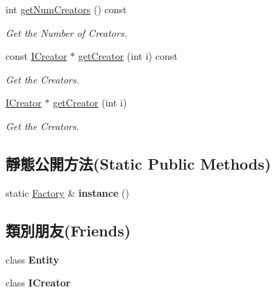 \begin{DoxyCompactItemize}
int \hyperlink{class_i_dream_sky_1_1_entity_1_1_factory_aa0df0ff18a2253daaf5a9542e7c211d9}{get\+Num\+Creators} () const 
\begin{DoxyCompactList}\small\item\em Get the Number of Creators. \end{DoxyCompactList}\item 
const \hyperlink{class_i_dream_sky_1_1_entity_1_1_i_creator}{I\+Creator} $\ast$ \hyperlink{class_i_dream_sky_1_1_entity_1_1_factory_a77214e9240de96dc15ac4b17cff90905}{get\+Creator} (int i) const 
\begin{DoxyCompactList}\small\item\em Get the Creators. \end{DoxyCompactList}\item 
\hyperlink{class_i_dream_sky_1_1_entity_1_1_i_creator}{I\+Creator} $\ast$ \hyperlink{class_i_dream_sky_1_1_entity_1_1_factory_aba98c9dfb45cb78f8c5430d27682c7fd}{get\+Creator} (int i)
\begin{DoxyCompactList}\small\item\em Get the Creators. \end{DoxyCompactList}\end{DoxyCompactItemize}
\subsection*{靜態公開方法(Static Public Methods)}
\begin{DoxyCompactItemize}
\item 
static \hyperlink{class_i_dream_sky_1_1_entity_1_1_factory}{Factory} \& {\bfseries instance} ()\hypertarget{class_i_dream_sky_1_1_entity_1_1_factory_ae0bfdc4b2ce5f66204595dcac9ce1c36}{}\label{class_i_dream_sky_1_1_entity_1_1_factory_ae0bfdc4b2ce5f66204595dcac9ce1c36}

\end{DoxyCompactItemize}
\subsection*{類別朋友(Friends)}
\begin{DoxyCompactItemize}
\item 
class {\bfseries Entity}\hypertarget{class_i_dream_sky_1_1_entity_1_1_factory_a614439ccac0344926adc4c0165d64060}{}\label{class_i_dream_sky_1_1_entity_1_1_factory_a614439ccac0344926adc4c0165d64060}

\item 
class {\bfseries I\+Creator}\hypertarget{class_i_dream_sky_1_1_entity_1_1_factory_a6d6e56ac47edfce9d2590e0757222ded}{}\label{class_i_dream_sky_1_1_entity_1_1_factory_a6d6e56ac47edfce9d2590e0757222ded}

\end{DoxyCompactItemize}


